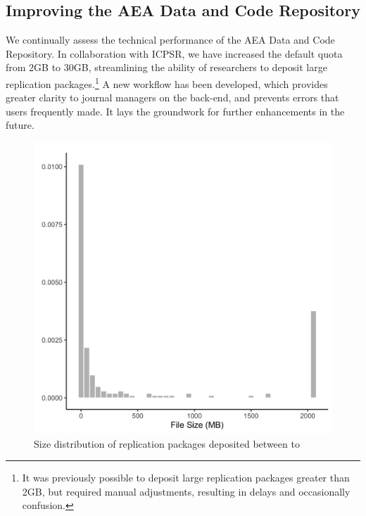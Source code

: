 \documentclass[PP]{AEA}
\newcommand{\aeadcr}{AEA Data and Code Repository}
\begin{document}
\subsection{Improving the \aeadcr{}}
\label{sec:improvingaeadcr}

We continually assess the technical performance of the \aeadcr{}. In collaboration with ICPSR, we have increased the default quota from 2GB to 30GB, streamlining the ability of researchers to deposit large replication packages.\footnote{It was previously possible to deposit large replication packages greater than 2GB, but required manual adjustments, resulting in delays and occasionally confusion.} A new workflow has been developed, which provides greater clarity to journal managers on the back-end, and prevents errors that users frequently made. It lays the groundwork for further enhancements in the future. 


\begin{figure}[t]
    \centering
    \includegraphics[width=\textwidth]{images/plot_filesize_dist.png} 
    \caption{Size distribution of replication packages deposited between  \firstday{} to \lastday{}}
    \label{fig:size_packages}
\end{figure}
\end{document}
